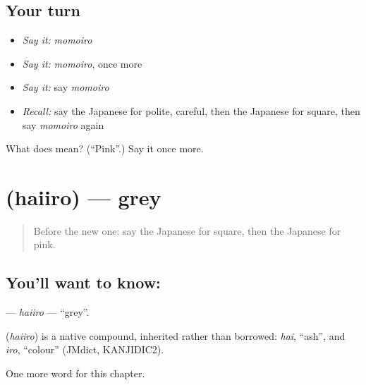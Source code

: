\subsection*{Your turn}
\begin{itemize}
\raggedright
  \item \emph{Say it:} \emph{momoiro}
  \item \emph{Say it:} \emph{momoiro}, once more
  \item \emph{Say it:} say \emph{momoiro}
  \item \emph{Recall:} say the Japanese for polite, careful, then the Japanese for square, then say \emph{momoiro} again
\end{itemize}

\begin{tcolorbox}[breakable,colback=teal!4,colframe=teal!35!black,title={Before you move on}]
What does  mean? (\textquotedblleft{}Pink\textquotedblright{}.) Say it once more.
\end{tcolorbox}
\section[\texorpdfstring{\ja{はいいろ} (haiiro)}{はいいろ (haiiro)}]{ (haiiro) — grey}

\label{lesson:JA-C121-haiiro}



\begin{quote}
Before the new one: say the Japanese for square, then the Japanese for pink.
\end{quote}

\subsection*{You'll want to know: }
\textbf{} — \emph{haiiro} — \textquotedblleft{}grey\textquotedblright{}.

\begin{cousinweb}
\textbf{} (\emph{haiiro}) is a native compound, inherited rather than borrowed: \emph{hai}, \textquotedblleft{}ash\textquotedblright{}, and \emph{iro}, \textquotedblleft{}colour\textquotedblright{} (JMdict, KANJIDIC2).
\end{cousinweb}

\begin{grammarlens}[title={What you've built}]
One more word for this chapter.
\end{grammarlens}

